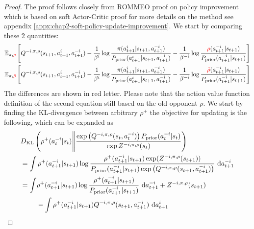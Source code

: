 \begin{proof}
The proof follows closely from ROMMEO proof on policy improvement \cite{tian2019regularized} which is based on soft Actor-Critic \cite{haarnoja2018softa} proof for more details on the method see appendix \ref{appx:chap2-soft-policy-update-improvement}. We start by comparing these 2 quantities:
\begin{equation*}
\begin{aligned}
    &\mathbb{E}_{\pi, {\color{red} \rho}}\left[ Q^{-i, \pi, \rho}(s_{t+1}, a^i_{t+1}, a^{-i}_{t+1}) - \frac{1}{\beta^i} \log\frac{\pi(a^i_{t+1}|s_{t+1}, a^{-i}_{t+1})}{P_{\text{prior}}(a^i_{t+1}|s_{t+1}, a^{-i}_{t+1})} - \frac{1}{\beta^{-i}}\log \frac{{\color{red} \rho}(a^{-i}_{t+1}|s_{t+1})}{P_{\text{prior}}(a^{-i}_{t+1}|s_{t+1})} \right] \\
    &\mathbb{E}_{\pi, {\color{red} \tilde{\rho}}}\left[ Q^{-i, \pi, \rho}(s_{t+1}, a^i_{t+1}, a^{-i}_{t+1}) - \frac{1}{\beta^i} \log\frac{\pi(a^i_{t+1}|s_{t+1}, a^{-i}_{t+1})}{P_{\text{prior}}(a^i_{t+1}|s_{t+1}, a^{-i}_{t+1})} - \frac{1}{\beta^{-i}}\log \frac{{\color{red} \tilde{\rho}}(a^{-i}_{t+1}|s_{t+1})}{P_{\text{prior}}(a^{-i}_{t+1}|s_{t+1})} \right]
\end{aligned}
\end{equation*}
The differences are shown in red letter. Please note that the action value function definition of the second equation still based on the old opponent $\rho$. We start by finding the KL-divergence between arbitrary $\rho^+$ the objective for updating is the following, which can be expanded as 
\begin{equation*}
\begin{aligned}
    &\kl \bracka{ \rho^+(a^{-i}_t | s_t) \Bigg\| \frac{\exp\bracka{Q^{-i, \pi, \rho}(s_t, a^{-i}_t)} P_\prior(a^{-i}_t | s_t)}{\exp Z^{-i, \pi, \rho}(s_t)}} \\
    &= \int  \rho^+(a^{-i}_{t+1} | s_{t+1}) \log \frac{\rho^+(a^{-i}_{t+1} | s_{t+1}) \exp(Z^{-i, \pi, \rho}(s_{t+1})) }{P_\prior(a^{-i}_{t+1} | s_{t+1}) \exp\bracka{Q^{-i, \pi, \rho}(s_{t+1}, a^{-i}_{t+1})} } \dby a^{-i}_{t+1} \\
    &=\begin{aligned}[t]
    \int &\rho^+(a^{-i}_{t+1} | s_{t+1}) \log\frac{\rho^+(a^{-i}_{t+1} | s_{t+1})}{P_\prior(a^{-i}_{t+1} | s_{t+1})} \dby a^{-i}_{t+1} + Z^{-i, \pi, \rho}(s_{t+1}) \\
    &- \int \rho^+(a^{-i}_{t+1} | s_{t+1}) Q^{-i, \pi, \rho}(s_{t+1}, a^{-i}_{t+1}) \dby a^{i}_{t+1}
    \end{aligned}
\end{aligned}

\end{equation*}
\end{proof}
